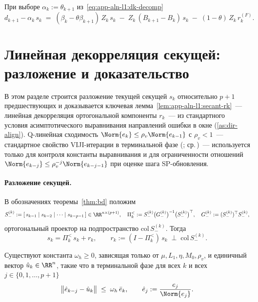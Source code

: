 При выборе $\alpha_k := \theta_{k+1}$ из~\eqref{eq:app-aln-l1:dk-decomp}
\begin{equation}
d_{k+1} - \alpha_k\,s_k
\;=\; (\beta_k - \theta\beta_{k+1})\,Z_k\,s_k
\;-\; Z_k\,(B_{k+1} - B_k)\,s_k \;-\; (1-\theta)\,Z_k\,r_k^{(F)}.
\label{eq:app-aln-l1:residual}
\end{equation}

\section{Линейная декорреляция секущей: разложение и доказательство}
\label{sec:app-aln-l1:secant-rk}

В этом разделе строится разложение текущей секущей $s_k$ относительно
$p+1$ предшествующих и доказывается ключевая
лемма~\ref{lem:app-aln-l1:secant-rk}~--- линейная декорреляция
ортогональной компоненты $r_k$~--- из стандартного условия
асимптотического выравнивания направлений ошибки в окне
\textup{(}\ref{as:dir-align}\textup{)}. Q-линейная сходимость
$\Norm{e_k}\le\rho_v\Norm{e_{k-1}}$ с $\rho_v < 1$~--- стандартное
свойство VIJI-итерации в терминальной фазе \textup{(}\cite[Theorem~3.4]{Agafonov2024VIJI};
ср.\,\cite[Definition~9.1.5]{dennis1996}\textup{)}~--- используется только
для контроля константы выравнивания и для ограниченности отношений
$\Norm{e_{k-j}}\le\rho_v^{-j}\Norm{e_{k-j-1}}$ при оценке шага
SP-обновления.

\paragraph{Разложение секущей.}
В обозначениях теоремы~\ref{thm:bd} положим
\begin{equation}
S_-^{(k)} := [\,s_{k-1}\mid s_{k-2}\mid\cdots\mid s_{k-p-1}\,] \in\RR^{n\times(p+1)},
\quad
\Pi_k^{<} := S_-^{(k)} \bigl(G_-^{(k)}\bigr)^{-1} \bigl(S_-^{(k)}\bigr)^{\top},
\quad
G_-^{(k)} := (S_-^{(k)})^{\top} S_-^{(k)},
\label{eq:app-aln-l1:Pi-past}
\end{equation}
ортогональный проектор на подпространство $\mathrm{col}\,S_-^{(k)}$. Тогда
\begin{equation}
s_k = \Pi_k^{<}\,s_k + r_k,
\qquad
r_k := (I - \Pi_k^{<})\,s_k \;\perp\; \mathrm{col}\,S_-^{(k)}.
\label{eq:app-aln-l1:sk-decomp}
\end{equation}

\begin{assumption}
\label{as:dir-align}
Существуют константа $\omega_h \ge 0$, зависящая только от
$\mu, L_1, \eta, M_{0}, \rho_v$, и единичный вектор
$\hat u_k \in \RR^{n}$, такие что в терминальной фазе для всех $k$
и всех $j \in \{0,1,\ldots,p+1\}$
\begin{equation}
\bigl\|\hat e_{k-j} - \hat u_k\bigr\| \;\le\; \omega_h\,\bar e_k,
\qquad \hat e_{j} := \frac{e_{j}}{\Norm{e_{j}}}.
\label{eq:app-aln-l1:dir-align}
\end{equation}
\end{assumption}

